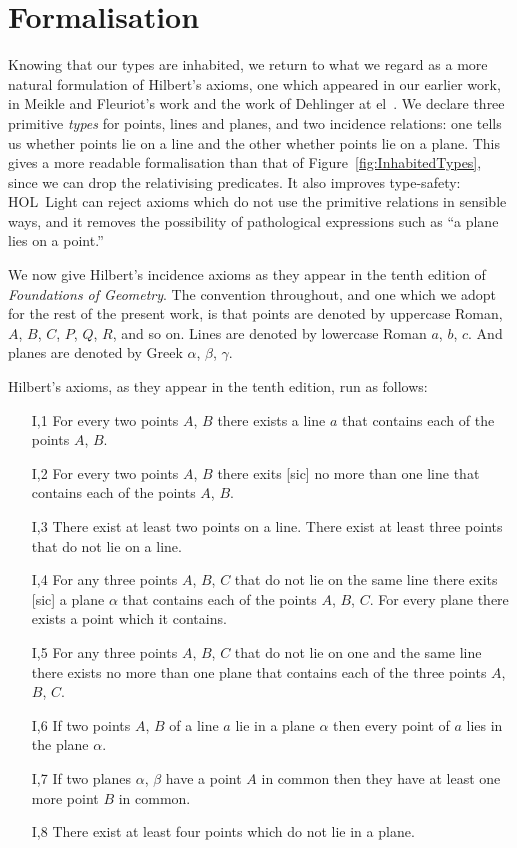 \section{Formalisation}
Knowing that our types are inhabited, we return to what we regard as a more natural formulation of Hilbert's axioms, one which appeared in our earlier work, in Meikle and Fleuriot's work and the work of Dehlinger at el~\cite{DehlingerFOG,MeikleFleuriotFormalizingHilbert,ScottMScThesis}. We declare three primitive \emph{types} for points, lines and planes, and two incidence relations: one tells us whether points lie on a line and the other whether points lie on a plane. This gives a more readable formalisation than that of Figure~\ref{fig:InhabitedTypes}, since we can drop the relativising predicates. It also improves type-safety: HOL~Light can reject axioms which do not use the primitive relations in sensible ways, and it removes the possibility of pathological expressions such as ``a plane lies on a point.''

We now give Hilbert's incidence axioms as they appear in the tenth edition of \emph{Foundations of Geometry}. The convention throughout, and one which we adopt for the rest of the present work, is that points are denoted by uppercase Roman, $A$, $B$, $C$, $P$, $Q$, $R$, and so on. Lines are denoted by lowercase Roman $a$, $b$, $c$. And planes are denoted by Greek $\alpha$, $\beta$, $\gamma$. 

Hilbert's axioms, as they appear in the tenth edition, run as follows:
\begin{enumerate}
\item[I,1] For every two points $A$, $B$ there exists a line $a$ that contains each of the points $A$, $B$.
\item[I,2] For every two points $A$, $B$ there exits [sic] no more than one line that contains each of the points $A$, $B$.
\item[I,3] There exist at least two points on a line. There exist at least three points that do not lie on a line.
\item[I,4] For any three points $A$, $B$, $C$ that do not lie on the same line there exits [sic] a plane $\alpha$ that contains each of the points $A$, $B$, $C$. For every plane there exists a point which it contains.
\item[I,5] For any three points $A$, $B$, $C$ that do not lie on one and the same line there exists no more than one plane that contains each of the three points $A$, $B$, $C$.
\item[I,6] If two points $A$, $B$ of a line $a$ lie in a plane $\alpha$ then every point of $a$ lies in the plane $\alpha$.
\item[I,7] If two planes $\alpha$, $\beta$ have a point $A$ in common then they have at least one more point $B$ in common.
\item[I,8] There exist at least four points which do not lie in a plane.
\end{enumerate}

